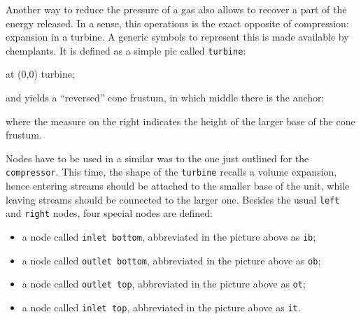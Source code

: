 \documentclass[12pt]{article}						%
\newcommand*{\chpn}[1]{\texttt{#1}}				%
\newcommand*{\chpp}[1]{\texttt{#1}}				%
\newcommand*{\chemplants}{chemplants}
\begin{document}
Another way to reduce the pressure of a gas also allows to recover a part of the
energy released. In a sense, this operations is the exact opposite of
compression: expansion in a turbine. A generic symbols to represent this is made
available by \chemplants. It is defined as a simple pic called \chpp{turbine}:
\begin{chpcode}
	\pic at (0,0) {turbine};
\end{chpcode}
and yields a ``reversed'' cone frustum, in which middle there is the anchor:
\begin{center}
\end{center}
where the measure on the right indicates the height of the larger base of the
cone frustum.

Nodes have to be used in a similar was to the one just outlined for the
\chpp{compressor}. This time, the shape of the \chpp{turbine} recalls a volume
expansion, hence entering streams should be attached to the smaller base of
the unit, while leaving streams should be connected to the larger one. Besides
the usual \chpn{left} and \chpn{right} nodes, four special nodes are defined:
\begin{itemize}
	\item a node called \chpn{inlet bottom}, abbreviated in the picture above as
		\chpn{ib};
	\item a node called \chpn{outlet bottom}, abbreviated in the picture above as
		\chpn{ob};
	\item a node called \chpn{outlet top}, abbreviated in the picture above as
		\chpn{ot};
	\item a node called \chpn{inlet top}, abbreviated in the picture above as
		\chpn{it}.
\end{itemize}
\end{document}
